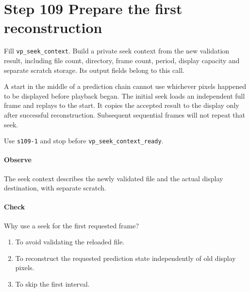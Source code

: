 \section{Step 109 Prepare the first reconstruction}
Fill \texttt{vp\_seek\_context}. Build a private seek context from the new validation result, including file count, directory, frame count, period, display capacity and separate scratch storage. Its output fields belong to this call.

A start in the middle of a prediction chain cannot use whichever pixels happened to be displayed before playback began. The initial seek loads an independent full frame and replays to the start. It copies the accepted result to the display only after successful reconstruction. Subsequent sequential frames will not repeat that seek.

Use \texttt{s109-1} and stop before \texttt{vp\_seek\_context\_ready}.

\paragraph{Observe} The seek context describes the newly validated file and the actual display destination, with separate scratch.

\paragraph{Check} Why use a seek for the first requested frame?
\begin{enumerate}[label=\Alph*.]
  \item To avoid validating the reloaded file.
  \item To reconstruct the requested prediction state independently of old display pixels.
  \item To skip the first interval.
\end{enumerate}
